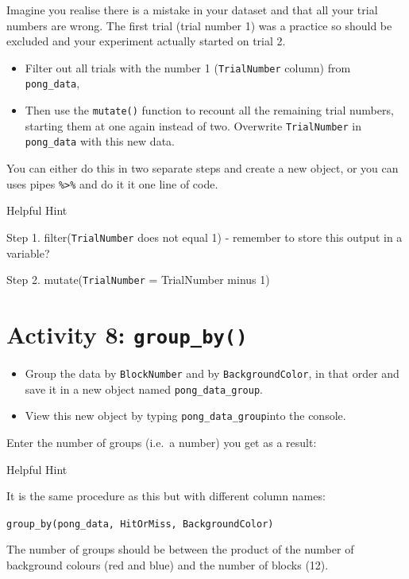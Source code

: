\documentclass[]{book}
\providecommand{\tightlist}{%
  \setlength{\itemsep}{0pt}\setlength{\parskip}{0pt}}
\begin{document}
Imagine you realise there is a mistake in your dataset and that all your trial numbers are wrong. The first trial (trial number 1) was a practice so should be excluded and your experiment actually started on trial 2.

\begin{itemize}
\tightlist
\item
  Filter out all trials with the number 1 (\texttt{TrialNumber} column) from \texttt{pong\_data},
\item
  Then use the \texttt{mutate()} function to recount all the remaining trial numbers, starting them at one again instead of two. Overwrite \texttt{TrialNumber} in \texttt{pong\_data} with this new data.
\end{itemize}

You can either do this in two separate steps and create a new object, or you can uses pipes \texttt{\%\textgreater{}\%} and do it it one line of code.

Helpful Hint

Step 1. filter(\texttt{TrialNumber} does not equal 1) - remember to store this output in a variable?

Step 2. mutate(\texttt{TrialNumber} = TrialNumber minus 1)

\hypertarget{activity-8-group_by}{%
\section{\texorpdfstring{Activity 8: \texttt{group\_by()}}{Activity 8: group\_by()}}\label{activity-8-group_by}}

\begin{itemize}
\tightlist
\item
  Group the data by \texttt{BlockNumber} and by \texttt{BackgroundColor}, in that order and save it in a new object named \texttt{pong\_data\_group}.
\item
  View this new object by typing \texttt{pong\_data\_group}into the console.
\end{itemize}

Enter the number of groups (i.e.~a number) you get as a result:

Helpful Hint

It is the same procedure as this but with different column names:

\texttt{group\_by(pong\_data,\ HitOrMiss,\ BackgroundColor)}

The number of groups should be between the product of the number of background colours (red and blue) and the number of blocks (12).
\end{document}
